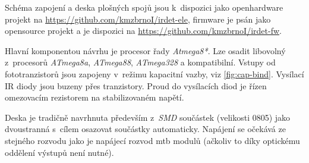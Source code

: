 Schéma zapojení a deska plošných spojů jsou k~dispozici jako openhardware
projekt na \url{https://github.com/kmzbrnoI/irdet-ele}, firmware je psán jako
opensource projekt a je dispozici na
\url{https://github.com/kmzbrnoI/irdet-fw}.

Hlavní komponentou návrhu je procesor řady \textit{Atmega8*}. Lze osadit
libovolný z~procesorů \textit{ATmega8a}, \textit{ATmega88}, \textit{ATmega328}
a kompatibilní. Vstupy od fototranzistorů jsou zapojeny v~režimu kapacitní
vazby, viz \ref{fig:cap-bind}. Vysílací IR diody jsou buzeny přes tranzistory.
Proud do vysílacích diod je řízen omezovacím rezistorem na stabilizovaném
napětí.

Deska je tradičně navrhnuta především z~\textit{SMD} součástek (velikosti 0805)
jako dvoustranná s~cílem osazovat součástky automaticky. Napájení se očekává
ze stejného rozvodu jako je napájecí rozvod \gls{mtb} modulů (ačkoliv to díky
optickému oddělení výstupů není nutné).
